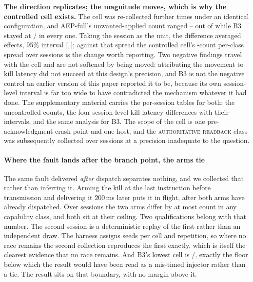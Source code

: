 \textbf{The direction replicates; the magnitude moves, which is why the
controlled cell exists.} The cell was re-collected \ReplicationSessions{}
further times under an identical configuration, and AEP-full's unwanted-applied
count ranged \ReplicationAepMin{}--\ReplicationAepMax{} out of \AepKillRuns{}
while B3 stayed at \ReplicationBthreeApplied{}/\AepKillRuns{} in every one.
Taking the session as the unit, the difference averaged
\ReplicationPreventedMean{} effects, 95\% interval
[\ReplicationPreventedLow{},\,\ReplicationPreventedHigh{}]; against that spread
the controlled cell's \ArmASpreadMax{}-count per-class spread over
\ArmASessions{} sessions is the change worth reporting. Two negative findings
travel with the cell and are not softened by being moved: attributing the
movement to kill latency did not succeed at this design's precision, and B3 is
not the negative control an earlier version of this paper reported it to be,
because its own session-level interval is far too wide to have contradicted the
mechanism whatever it had done. The supplementary material carries the
per-session tables for both: the uncontrolled counts, the four session-level
kill-latency differences with their intervals, and the same analysis for B3.
The scope of the cell is one pre-acknowledgment crash point and one host, and
the \textsc{authoritative-readback} class was subsequently collected over
\ClassSessions{} sessions at a precision inadequate to the
question.

\paragraph{Where the fault lands after the branch point, the arms tie} The
same fault delivered \emph{after} dispatch separates nothing, and we collected
that rather than inferring it. Arming the kill at the last instruction before
transmission and delivering it $200$\,ms later puts it in flight, after both
arms have already dispatched. Over \InflightSessions{} sessions the two arms
differ by at most \InflightMaxDiff{} count in any capability class, and both sit
at their ceiling. Two qualifications belong with that number. The second session
is a deterministic replay of the first rather than an independent draw. The
harness assigns seeds per cell and repetition, so where no race remains the
second collection reproduces the first exactly, which is itself the clearest
evidence that no race remains. And B3's lowest cell is
\InflightBthreeFloor{}/\AepKillRuns{}, exactly the floor below which the result
would have been read as a mis-timed injector rather than a tie. The result
sits on that boundary, with no margin above it.

